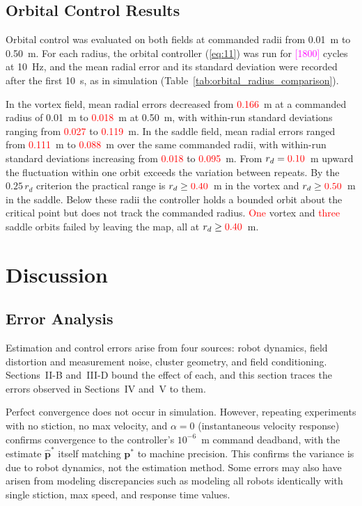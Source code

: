 \documentclass[lettersize,journal]{IEEEtran}
\newcommand{\syn}[1]{\textcolor{red}{#1}}            %
\newcommand{\open}[1]{\textcolor{magenta}{[#1]}}     %
\begin{document}
\subsection{Orbital Control Results}

Orbital control was evaluated on both fields at commanded radii from 0.01~m to 0.50~m. For each radius, the orbital controller (\ref{eq:11}) was run for \open{1800} cycles at 10~Hz, and the mean radial error and its standard deviation were recorded after the first 10~s, as in simulation (Table~\ref{tab:orbital_radius_comparison}). %

 In the vortex field, mean radial errors decreased from \syn{0.166}~m at a commanded radius of 0.01~m to \syn{0.018}~m at 0.50~m, with within-run standard deviations ranging from \syn{0.027} to \syn{0.119}~m. In the saddle field, mean radial errors ranged from \syn{0.111}~m to \syn{0.088}~m over the same commanded radii, with within-run standard deviations increasing from \syn{0.018} to \syn{0.095}~m. From $r_d = \syn{0.10}$~m upward the fluctuation within one orbit exceeds the variation between repeats. By the $0.25\,r_d$ criterion the practical range is $r_d \ge \syn{0.40}$~m in the vortex and $r_d \ge \syn{0.50}$~m in the saddle. Below these radii the controller holds a bounded orbit about the critical point but does not track the commanded radius. \syn{One} vortex and \syn{three} saddle orbits failed by leaving the map, all at $r_d \ge \syn{0.40}$~m. %




\section{Discussion}

\subsection{Error Analysis}

Estimation and control errors arise from four sources: robot dynamics, field distortion and measurement noise, cluster geometry, and field conditioning. Sections~II-B and~III-D bound the effect of each, and this section traces the errors observed in Sections~IV and~V to them.

Perfect convergence does not occur in simulation. However, repeating experiments with no stiction, no max velocity, and $\alpha = 0$ (instantaneous velocity response) confirms convergence to the controller's $10^{-6}$~m command deadband, with the estimate $\hat{\mathbf{p}}^*$ itself matching $\mathbf{p}^*$ to machine precision. This confirms the variance is due to robot dynamics, not the estimation method. Some errors may also have arisen from modeling discrepancies such as modeling all robots identically with single stiction, max speed, and response time values.
\end{document}
